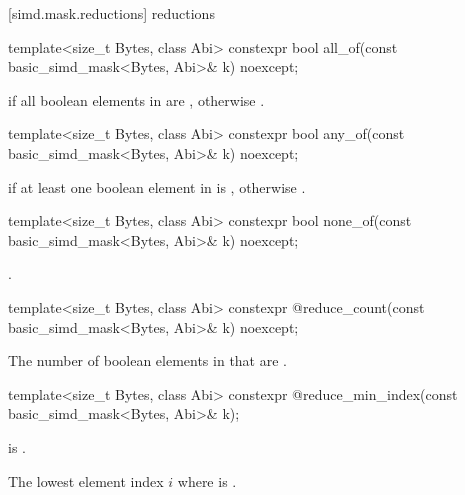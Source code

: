 [simd.mask.reductions]{ reductions}

\begin{itemdecl}
template<size_t Bytes, class Abi>
  constexpr bool all_of(const basic_simd_mask<Bytes, Abi>& k) noexcept;
\end{itemdecl}

\begin{itemdescr}
  \pnum\returns
   if all boolean elements in  are , otherwise .
\end{itemdescr}

\begin{itemdecl}
template<size_t Bytes, class Abi>
  constexpr bool any_of(const basic_simd_mask<Bytes, Abi>& k) noexcept;
\end{itemdecl}

\begin{itemdescr}
  \pnum\returns
   if at least one boolean element in  is , otherwise
  .
\end{itemdescr}

\begin{itemdecl}
template<size_t Bytes, class Abi>
  constexpr bool none_of(const basic_simd_mask<Bytes, Abi>& k) noexcept;
\end{itemdecl}

\begin{itemdescr}
  \pnum\returns {}.
\end{itemdescr}

\begin{itemdecl}
template<size_t Bytes, class Abi>
  constexpr @\simdsizetype@ reduce_count(const basic_simd_mask<Bytes, Abi>& k) noexcept;
\end{itemdecl}

\begin{itemdescr}
  \pnum\returns
  The number of boolean elements in  that are .
\end{itemdescr}

\begin{itemdecl}
template<size_t Bytes, class Abi>
  constexpr @\simdsizetype@ reduce_min_index(const basic_simd_mask<Bytes, Abi>& k);
\end{itemdecl}

\begin{itemdescr}
  \pnum\expects
   is .

  \pnum\returns
  The lowest element index $i$ where  is .
\end{itemdescr}

